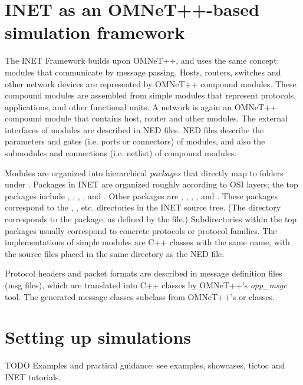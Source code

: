 \section{INET as an OMNeT++-based simulation framework}

The INET Framework builds upon OMNeT++, and uses the same concept: modules
that communicate by message passing. Hosts, routers, switches and other
network devices are represented by OMNeT++ compound modules. These compound
modules are assembled from simple modules that represent protocols,
applications, and other functional units. A network is again an OMNeT++
compound module that contains host, router and other modules. The external
interfaces of modules are described in NED files. NED files describe the
parameters and gates (i.e. ports or connectors) of modules, and also the
submodules and connections (i.e. netlist) of compound modules.

Modules are organized into hierarchical \textit{packages} that directly map to
folders under . Packages in
INET are organized roughly according to OSI layers; the top packages
include , ,
, , and . 
Other packages are , , , 
, and . These packages correspond to the
, , etc. directories in the
INET source tree. (The  directory corresponds to the  
package, as defined by the  file.) Subdirectories
within the top packages usually correspond to concrete protocols or protocol
families. The implementations of simple modules are C++ classes with the same
name, with the source files placed in the same directory as the NED file.

Protocol headers and packet formats are described in message definition
files (msg files), which are translated into C++ classes by OMNeT++'s
\textit{opp\_msgc} tool. The generated message classes subclass from OMNeT++'s
 or  classes.

\section{Setting up simulations}

TODO Examples and practical  guidance: see examples, showcases, tictoc and INET tutorials.



